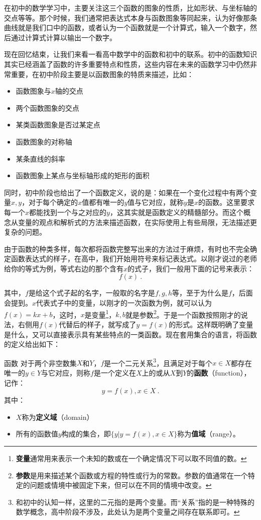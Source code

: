 在初中的数学学习中，主要关注这三个函数的图象的性质，比如形状、与坐标轴的交点等等。那个时候，我们通常把表达式本身与函数图象等同起来，认为好像那条曲线就是我们口中的函数，或者认为一个函数就是一个计算式，输入一个数字，然后通过计算式计算以输出一个数字。

现在回忆结束，让我们来看一看高中数学中的函数和初中的联系。初中的函数知识其实已经涵盖了函数的许多重要特点和性质，这些内容在未来的函数学习中仍然非常重要，在初中阶段主要是以函数图象的特质来描述，比如：
\begin{itemize}
\item 函数图象与$x$轴的交点
\item 两个函数图象的交点
\item 某类函数图象是否过某定点
\item 函数图象的对称轴
\item 某条直线的斜率
\item 函数图象上某点与坐标轴形成的矩形的面积
\end{itemize}

同时，初中阶段也给出了一个函数定义，说的是：如果在一个变化过程中有两个变量$x,y$，对于每个确定的$x$值都有唯一的$y$值与它对应，就称$y$是$x$的函数。这里要求每一个$x$都能找到一个与之对应的$y$，这其实就是函数定义的精髓部分。而这个概念从变量的观点和解析式的方法来描述函数，在实际使用上有些局限，无法描述更复杂的问题。

由于函数的种类多样，每次都将函数完整写出来的方法过于麻烦，有时也不完全确定函数表达式的样子，在高中，我们开始用符号来标记表达式。以刚才说过的老师给你的等式为例，等式右边的那个含有$x$的式子，我们一般用下面的记号来表示：
\begin{equation}
f(x)~.
\end{equation}

其中，$f$是给这个式子起的名字，一般取的名字是$f,g,h$等，至于为什么是$f$，后面会提到。$x$代表式子中的变量，以刚才的一次函数为例，就可以认为$f(x)=kx+b$，这时，$x$是变量\footnote{\textbf{变量}通常用来表示一个未知的数或在一个确定情况下可以取不同值的数。}，$k,b$就是参数\footnote{\textbf{参数}是用来描述某个函数或方程的特性或行为的常数。参数的值通常在一个特定的问题或情境中被固定下来，但可以在不同的情境中改变。}。于是一个函数按照刚才的说法，右侧用$f(x)$代替后的样子，就写成了$y=f(x)$的形式。这样既明确了变量是什么，又可以直接表示具有某些特点的一类函数。现在套用集合的语言，将函数的定义给出如下：

\begin{definition}{函数}\label{def_functi_1}
对于两个非空数集$X$和$Y$，$f$是一个二元关系\footnote{和初中的认知一样，这里的二元指的是两个变量。而“关系”指的是一种特殊的数学概念，高中阶段不涉及，此处认为是两个变量之间存在联系即可。}，且满足对于每个$x\in X$都存在唯一的$y\in Y$与它对应，则称$f$是一个定义在$X$上的或从$X$到$Y$的\textbf{函数}（function），记作：
\begin{equation}
y=f(x),x\in X~.
\end{equation}
其中：
\begin{itemize}
\item $X$称为\textbf{定义域}（domain）
\item 所有的函数值$y$构成的集合，即$\{y|y=f(x),x\in X\}$称为\textbf{值域}（range）。
\end{itemize}
\end{definition}

